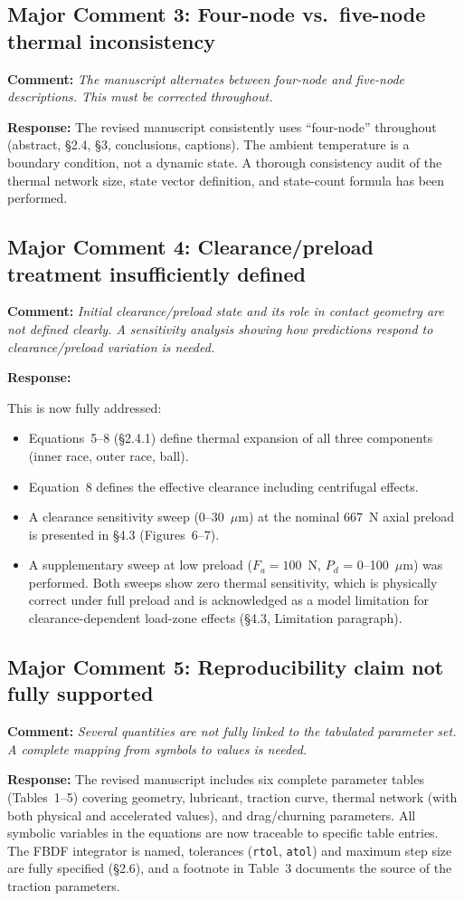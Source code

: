 \documentclass[11pt]{article}
\newcommand{\reviewer}[1]{\subsection*{#1}}
\newcommand{\comment}[1]{\textbf{Comment:} \textit{#1}\par\medskip}
\newcommand{\response}[1]{\textbf{Response:} \textcolor{response}{#1}\par\bigskip}
\begin{document}
\reviewer{Major Comment 3: Four-node vs.\ five-node thermal inconsistency}

\comment{The manuscript alternates between four-node and five-node descriptions. This must be corrected throughout.}

\response{The revised manuscript consistently uses ``four-node'' throughout (abstract, \S2.4, \S3, conclusions, captions). The ambient temperature is a boundary condition, not a dynamic state. A thorough consistency audit of the thermal network size, state vector definition, and state-count formula has been performed.}


\reviewer{Major Comment 4: Clearance/preload treatment insufficiently defined}

\comment{Initial clearance/preload state and its role in contact geometry are not defined clearly. A sensitivity analysis showing how predictions respond to clearance/preload variation is needed.}

\response{This is now fully addressed:
\begin{itemize}[nosep]
    \item Equations~5--8 (\S2.4.1) define thermal expansion of all three components (inner race, outer race, ball).
    \item Equation~8 defines the effective clearance including centrifugal effects.
    \item A clearance sensitivity sweep (0--30~$\mu$m) at the nominal 667~N axial preload is presented in \S4.3 (Figures~6--7).
    \item A supplementary sweep at low preload ($F_a = 100$~N, $P_d$ = 0--100~$\mu$m) was performed. Both sweeps show zero thermal sensitivity, which is physically correct under full preload and is acknowledged as a model limitation for clearance-dependent load-zone effects (\S4.3, Limitation paragraph).
\end{itemize}}


\reviewer{Major Comment 5: Reproducibility claim not fully supported}

\comment{Several quantities are not fully linked to the tabulated parameter set. A complete mapping from symbols to values is needed.}

\response{The revised manuscript includes six complete parameter tables (Tables~1--5) covering geometry, lubricant, traction curve, thermal network (with both physical and accelerated values), and drag/churning parameters. All symbolic variables in the equations are now traceable to specific table entries. The FBDF integrator is named, tolerances (\texttt{rtol}, \texttt{atol}) and maximum step size are fully specified (\S2.6), and a footnote in Table~3 documents the source of the traction parameters.}
\end{document}
